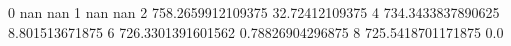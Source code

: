 0 nan nan
1 nan nan
2 758.2659912109375 32.72412109375
4 734.3433837890625 8.801513671875
6 726.3301391601562 0.78826904296875
8 725.5418701171875 0.0
